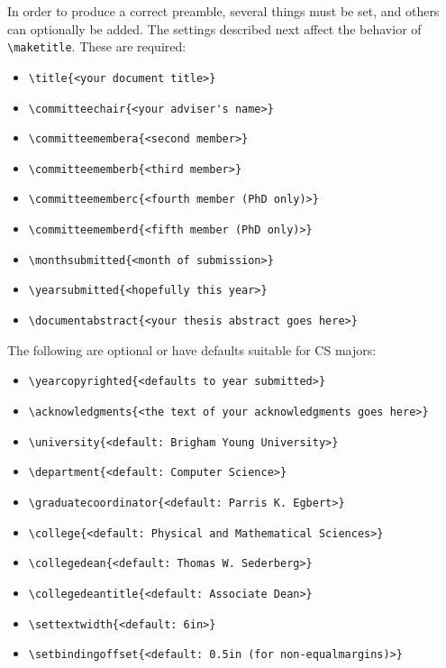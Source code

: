 \documentclass[phd,electronic,letterpaper,chaptercenter,parttop]{byumsphd}
\begin{document}
In order to produce a correct preamble, several things must be set, and others can optionally be added.  The settings described next affect the behavior of \verb|\maketitle|.  These are required:
\begin{itemize}
    \item \verb|\title{<your document title>}|
    \item \verb|\committeechair{<your adviser's name>}|
    \item \verb|\committeemembera{<second member>}|
    \item \verb|\committeememberb{<third member>}|
    \item \verb|\committeememberc{<fourth member (PhD only)>}|
    \item \verb|\committeememberd{<fifth member (PhD only)>}|
    \item \verb|\monthsubmitted{<month of submission>}|
    \item \verb|\yearsubmitted{<hopefully this year>}|
    \item \verb|\documentabstract{<your thesis abstract goes here>}|
\end{itemize}
The following are optional or have defaults suitable for CS majors:
\begin{itemize}
    \item \verb|\yearcopyrighted{<defaults to year submitted>}|
    \item \verb|\acknowledgments{<the text of your acknowledgments goes here>}|
    \item \verb|\university{<default: Brigham Young University>}|
    \item \verb|\department{<default: Computer Science>}|
    \item \verb|\graduatecoordinator{<default: Parris K. Egbert>}|
    \item \verb|\college{<default: Physical and Mathematical Sciences>}|
    \item \verb|\collegedean{<default: Thomas W. Sederberg>}|
    \item \verb|\collegedeantitle{<default: Associate Dean>}|
    \item \verb|\settextwidth{<default: 6in>}|
    \item \verb|\setbindingoffset{<default: 0.5in (for non-equalmargins)>}|
\end{itemize}
\end{document}
